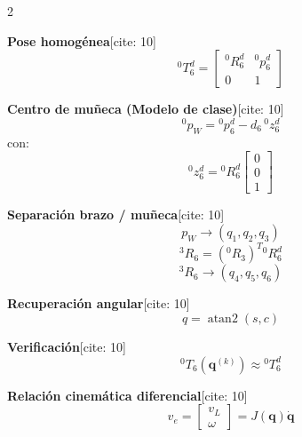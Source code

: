 \documentclass[10pt, a4paper]{article}
\begin{document}
\begin{multicols*}{2}
\small

\begin{tcolorbox}[sectionbox, title=1. Cinemática Inversa / Pieper{[cite: 10]}]
\textbf{Pose homogénea}[cite: 10]
\begin{equation*}
    {}^0T_6^d=
    \begin{bmatrix}
    {}^0R_6^d & {}^0p_6^d\\
    0&1
    \end{bmatrix}
\end{equation*}

\textbf{Centro de muñeca (Modelo de clase)}[cite: 10]
\begin{equation*}
    \boxed{ {}^0p_W = {}^0p_6^d - d_6\,{}^0z_6^d }
\end{equation*}
con:
\begin{equation*}
    \boxed{ {}^0z_6^d = {}^0R_6^d \begin{bmatrix} 0\\0\\1 \end{bmatrix} }
\end{equation*}

\textbf{Separación brazo / muñeca}[cite: 10]
\begin{equation*}
    p_W \rightarrow (q_1, q_2, q_3)
\end{equation*}
\begin{equation*}
    \boxed{ {}^3R_6 = ({}^0R_3)^T{}^0R_6^d }
\end{equation*}
\begin{equation*}
    {}^3R_6 \rightarrow (q_4, q_5, q_6)
\end{equation*}

\textbf{Recuperación angular}[cite: 10]
\begin{equation*}
    \boxed{ q=\operatorname{atan2}(s,c) }
\end{equation*}

\textbf{Verificación}[cite: 10]
\begin{equation*}
    \boxed{ {}^0T_6(\mathbf{q}^{(k)}) \approx {}^0T_6^d }
\end{equation*}
\end{tcolorbox}

\begin{tcolorbox}[sectionbox, title=2. Jacobiano Geométrico{[cite: 10]}]
\textbf{Relación cinemática diferencial}[cite: 10]
\begin{equation*}
    \boxed{ v_e= \begin{bmatrix} v_L\\ \omega \end{bmatrix} = J(\mathbf{q})\dot{\mathbf{q}} }
\end{equation*}


\end{tcolorbox}
\end{multicols*}
\end{document}
